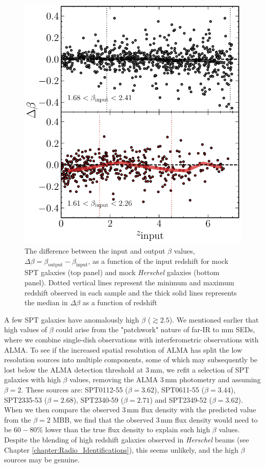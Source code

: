\begin{figure}
	\centering
	\includegraphics[width=0.8\columnwidth]{figures/beta_simulations.pdf}
	\caption[Difference between input and output $\beta$ from simulations of mock galaxies]{The difference between the input and output $\beta$ values, $\Delta \beta = \beta_{\textrm{output}} - \beta_{\textrm{input}}$, as a function of the input redshift for mock SPT galaxies (top panel) and mock \textit{Herschel} galaxies (bottom panel). Dotted vertical lines represent the minimum and maximum redshift observed in each sample and the thick solid lines represents the median in $\Delta \beta$ as a function of redshift}
	\label{fig:beta_z_simulation}
\end{figure}

A few SPT galaxies have anomalously high $\beta$ ($\gtrsim 2.5$). We mentioned earlier that high values of $\beta$ could arise from the "patchwork" nature of far-IR to mm SEDs, where we combine single-dish observations with interferometric observations with ALMA. To see if the increased spatial resolution of ALMA has split the low resolution sources into multiple components, some of which may subsequently be lost below the ALMA detection threshold at $3\,$mm, we refit a selection of SPT galaxies with high $\beta$ values, removing the ALMA $3\,$mm photometry and assuming $\beta = 2$. These sources are: SPT0112-55 ($\beta = 3.62$), SPT0611-55 ($\beta = 3.44$), SPT2335-53 ($\beta = 2.68$), SPT2340-59 ($\beta = 2.71$) and SPT2349-52 ($\beta = 3.62$). When we then compare the observed $3\,$mm flux density with the predicted value from the $\beta = 2$ MBB, we find that the observed $3\,$mm flux density would need to be $60 - 80\%$ lower than the true flux density to explain such high $\beta$ values. Despite the blending of high redshift galaxies observed in \textit{Herschel} beams (see Chapter \ref{chapter:Radio_Identifications}), this seems unlikely, and the high $\beta$ sources may be genuine.

